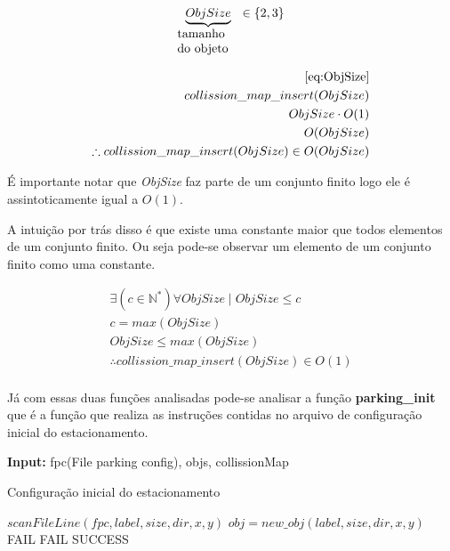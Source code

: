 \documentclass[11pt]{article}
\begin{document}
\begin{equation}\label{eq:ObjSize}
\underbrace{ObjSize}_{\parbox{1.75cm}{ tamanho do objeto}} \in \{2,3\}\\
\end{equation}

\begin{equation}
\begin{aligned}
\eqref{eq:ObjSize}\\
collission\_map\_insert(ObjSize)\\
ObjSize\cdot O(1)\\
O(ObjSize)\\
\therefore collission\_map\_insert(ObjSize) \in O(ObjSize) \\
\end{aligned}
\end{equation}

É importante notar que \emph{ObjSize} faz parte de um conjunto finito logo ele é assintoticamente igual a \(O(1)\). 

A intuição por trás disso é que existe uma constante maior que todos elementos de um conjunto finito. Ou seja pode-se observar um elemento de um conjunto finito como uma constante.

\begin{equation}\label{eq:ObjSizeO1}
\begin{aligned}
\exists (c \in \mathbb{N^{*}}) \forall ObjSize \mid ObjSize \leq c\\
c = max(ObjSize)\\
ObjSize\leq max(ObjSize)\\
\therefore collission\_map\_insert(ObjSize) \in O(1) \\
\end{aligned}
\end{equation}

Já com essas duas funções analisadas pode-se analisar a função \textbf{parking\_init} que é a função que realiza as instruções contidas no arquivo de configuração inicial do estacionamento.

\begin{algorithm}
\textbf{Input:} fpc(File parking config), objs, collissionMap 
\caption{Configuração inicial do estacionamento}\label{algorithmdpsmudar}
\begin{algorithmic}[1]
\State $scanFileLine(fpc,label,size,dir,x,y)$
\State $obj = new\_obj(label,size,dir,x,y)$
\State \Return FAIL
\EndIf
{}
\State \Return FAIL
\EndIf
\EndWhile
\State \Return SUCCESS
\EndProcedure
\end{algorithmic}
\end{algorithm}
\end{document}
